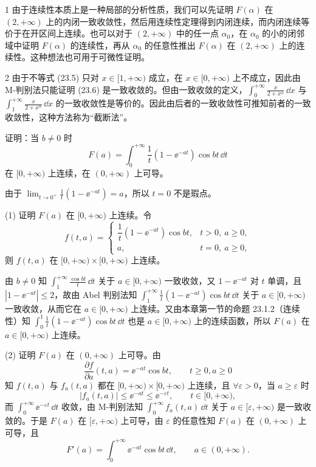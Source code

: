\begin{xremark}
1 由于连续性本质上是一种局部的分析性质，我们可以先证明 $F(\alpha)$ 在 $(2,+\infty)$ 上的内闭一致收敛性，然后用连续性定理得到内闭连续，而内闭连续等价于在开区间上连续。也可以对于 $(2,+\infty)$ 中的任一点 $\alpha_0$，在 $\alpha_0$ 的小的闭邻域中证明 $F(\alpha)$ 的连续性，再从 $\alpha_0$ 的任意性推出 $F(\alpha)$ 在 $(2,+\infty)$ 上的连续性。这种想法也可用于可微性证明。
\end{xremark}

\begin{xremark}
2 由于不等式 (23.5) 只对 $x\in[1,+\infty)$ 成立，在 $x\in[0,+\infty)$ 上不成立，因此由 M-判别法只能证明 (23.6) 是一致收敛的。但由一致收敛的定义，$\displaystyle\int_0^{+\infty}\frac{x}{2+x^\alpha}\,\dd x$ 与 $\displaystyle\int_1^{+\infty}\frac{x}{2+x^\alpha}\,\dd x$ 的一致收敛性是等价的。因此由后者的一致收敛性可推知前者的一致收敛性，这种方法称为“截断法”。
\end{xremark}

\begin{xexample}[23.2.7]
证明：当 $b\neq0$ 时
\[
  F(a)=\int_0^{+\infty}\frac1t(1-\ee^{-at})\cos bt\,\dd t
\]
在 $[0,+\infty)$ 上连续，在 $(0,+\infty)$ 上可导。
\end{xexample}
\begin{xproof}
由于 $\displaystyle\lim_{t\to0^+}\frac1t(1-\ee^{-at})=a$，所以 $t=0$ 不是瑕点。

(1) 证明 $F(a)$ 在 $[0,+\infty)$ 上连续。令
\[
  f(t,a)=
  \begin{cases}
    \dfrac1t(1-\ee^{-at})\cos bt,&t>0,\ a\geqslant0,\\
    a,&t=0,\ a\geqslant0,
  \end{cases}
\]
则 $f(t,a)$ 在 $[0,+\infty)\times[0,+\infty)$ 上连续。

由 $b\neq0$ 知 $\displaystyle\int_1^{+\infty}\frac{\cos bt}{t}\,\dd t$ 关于 $a\in[0,+\infty)$ 一致收敛，又 $1-\ee^{-at}$ 对 $t$ 单调，且 $|1-\ee^{-at}|\leqslant2$，故由 Abel 判别法知 $\displaystyle\int_1^{+\infty}\frac1t(1-\ee^{-at})\cos bt\,\dd t$ 关于 $a\in[0,+\infty)$ 一致收敛，从而它在 $a\in[0,+\infty)$ 上连续。又由本章第一节的命题 23.1.2（连续性）知 $\displaystyle\int_0^1\frac1t(1-\ee^{-at})\cos bt\,\dd t$ 也是 $a\in[0,+\infty)$ 上的连续函数，所以 $F(a)$ 在 $a\in[0,+\infty)$ 上连续。

(2) 证明 $F(a)$ 在 $(0,+\infty)$ 上可导。由
\[
  \frac{\partial f}{\partial a}(t,a)=\ee^{-at}\cos bt,\qquad t\geqslant0,a\geqslant0
\]
知 $f(t,a)$ 与 $f_a(t,a)$ 都在 $[0,+\infty)\times[0,+\infty)$ 上连续，且 $\forall\varepsilon>0$，当 $a\geqslant\varepsilon$ 时
\[
  |f_a(t,a)|\leqslant\ee^{-at}\leqslant\ee^{-\varepsilon t},\qquad t\in[0,+\infty),
\]
而 $\displaystyle\int_0^{+\infty}\ee^{-\varepsilon t}\,\dd t$ 收敛，由 M-判别法知 $\displaystyle\int_0^{+\infty}f_a(t,a)\,\dd t$ 关于 $a\in[\varepsilon,+\infty)$ 是一致收敛的。于是 $F(a)$ 在 $[\varepsilon,+\infty)$ 上可导，由 $\varepsilon$ 的任意性知 $F(a)$ 在 $(0,+\infty)$ 上可导，且
\begin{equation}
  F'(a)=\int_0^{+\infty}\ee^{-at}\cos bt\,\dd t,\qquad a\in(0,+\infty).
  \tag{23.7}
\end{equation}
\end{xproof}

